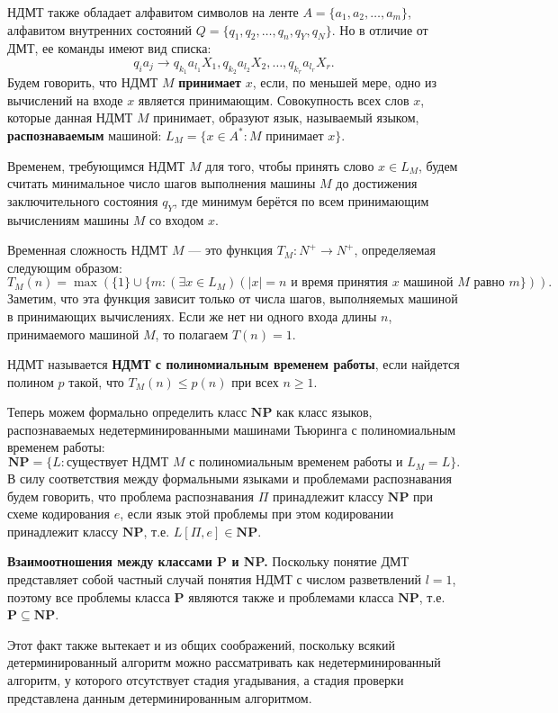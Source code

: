 \documentclass[a4paper,12pt]{article}
\begin{document}
НДМТ также обладает алфавитом символов на ленте \(A = \{a_1, a_2, \dots, a_m\}\), алфавитом внутренних состояний \(Q = \{q_1, q_2, \dots, q_n, q_Y, q_N\}\). Но в отличие от ДМТ, ее команды имеют вид списка:
\[
q_i a_j \to q_{k_1} a_{l_1} X_1, q_{k_2} a_{l_2} X_2, \dots, q_{k_r} a_{l_r} X_r.
\]
Будем говорить, что НДМТ \(M\) \textbf{принимает} \(x\), если, по меньшей мере, одно из вычислений на входе \(x\) является принимающим. Совокупность всех слов \(x\), которые данная НДМТ \(M\) принимает, образуют язык, называемый языком, \textbf{распознаваемым} машиной: \(L_M = \{x \in A^* : M \text{ принимает } x\}\).

Временем, требующимся НДМТ \(M\) для того, чтобы принять слово \(x \in L_M\), будем считать минимальное число шагов выполнения машины \(M\) до достижения заключительного состояния \(q_Y\), где минимум берётся по всем принимающим вычислениям машины \(M\) со входом \(x\).

Временная сложность НДМТ \(M\) --- это функция \(T_M: N^+ \to N^+\), определяемая следующим образом:
\[
T_M(n) = \max (\{1\} \cup \{m : (\exists x \in L_M)(|x| = n \text{ и время принятия } x \text{ машиной } M \text{ равно } m\}) ).
\]
Заметим, что эта функция зависит только от числа шагов, выполняемых машиной в принимающих вычислениях. Если же нет ни одного входа длины \(n\), принимаемого машиной \(M\), то полагаем \(T(n) = 1\).

НДМТ называется \textbf{НДМТ с полиномиальным временем работы}, если найдется полином \(p\) такой, что \(T_M(n) \le p(n)\) при всех \(n \ge 1\).

Теперь можем формально определить класс \(\mathbf{NP}\) как класс языков, распознаваемых недетерминированными машинами Тьюринга с полиномиальным временем работы:
\[
\mathbf{NP} = \{L : \text{существует НДМТ } M \text{ с полиномиальным временем работы и } L_M = L\}.
\]
В силу соответствия между формальными языками и проблемами распознавания будем говорить, что проблема распознавания \(\Pi\) принадлежит классу \(\mathbf{NP}\) при схеме кодирования \(e\), если язык этой проблемы при этом кодировании принадлежит классу \(\mathbf{NP}\), т.е. \(L[\Pi, e] \in \mathbf{NP}\).

\textbf{Взаимоотношения между классами P и NP.} Поскольку понятие ДМТ представляет собой частный случай понятия НДМТ с числом разветвлений \(l = 1\), поэтому все проблемы класса \(\mathbf{P}\) являются также и проблемами класса \(\mathbf{NP}\), т.е. \(\mathbf{P} \subseteq \mathbf{NP}\).

Этот факт также вытекает и из общих соображений, поскольку всякий детерминированный алгоритм можно рассматривать как недетерминированный алгоритм, у которого отсутствует стадия угадывания, а стадия проверки представлена данным детерминированным алгоритмом.
\end{document}

